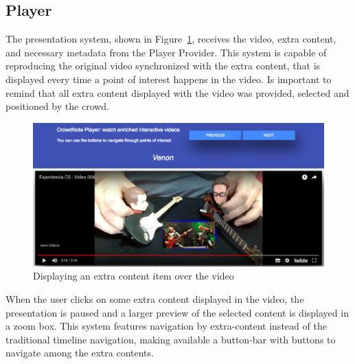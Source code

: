 \subsection{Player}

The presentation system, shown in Figure~\ref{player}, receives the video, extra content, and necessary metadata from the Player Provider. This system is capable of reproducing the original video synchronized with the extra content, that is displayed every time a point of interest happens in the video. Is important to remind that all extra content displayed with the video was provided, selected and positioned by the crowd.



\begin{figure}[h!]
	\centerline{\includegraphics[scale=0.20] {figure/player_new}}
	\caption{Displaying an extra content item over the video}
	\label{player}
\end{figure}


When the user clicks on some extra content displayed in the video, the presentation is paused and a larger preview of the selected content is displayed in a zoom box. This system features navigation by extra-content instead of the traditional timeline navigation, making available a button-bar with buttons to navigate among the extra contents.


